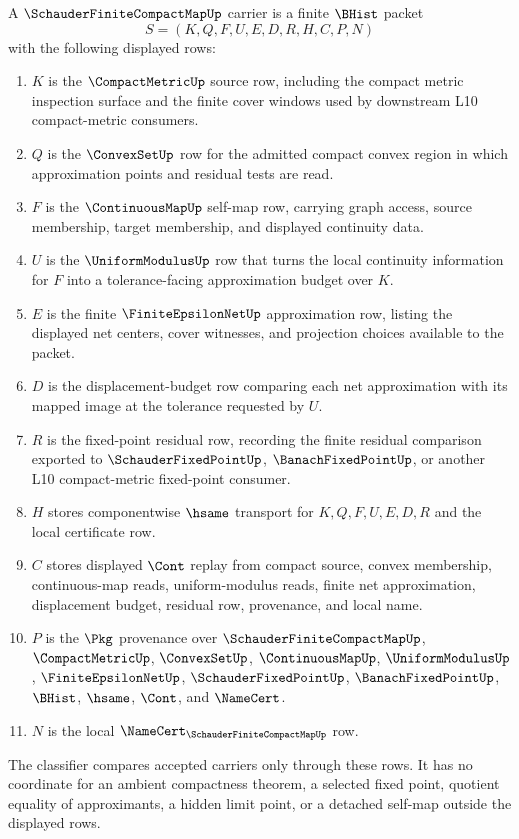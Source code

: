 \begin{definition}
\label{def:schauder-finite-compact-map-carrier}
A $\SchauderFiniteCompactMapUp$ carrier is a finite $\BHist$ packet
$$
S=(K,Q,F,U,E,D,R,H,C,P,N)
$$
with the following displayed rows:
\begin{enumerate}
\item $K$ is the $\CompactMetricUp$ source row, including the compact metric inspection surface and the finite cover windows used by downstream L10 compact-metric consumers.
\item $Q$ is the $\ConvexSetUp$ row for the admitted compact convex region in which approximation points and residual tests are read.
\item $F$ is the $\ContinuousMapUp$ self-map row, carrying graph access, source membership, target membership, and displayed continuity data.
\item $U$ is the $\UniformModulusUp$ row that turns the local continuity information for $F$ into a tolerance-facing approximation budget over $K$.
\item $E$ is the finite $\FiniteEpsilonNetUp$ approximation row, listing the displayed net centers, cover witnesses, and projection choices available to the packet.
\item $D$ is the displacement-budget row comparing each net approximation with its mapped image at the tolerance requested by $U$.
\item $R$ is the fixed-point residual row, recording the finite residual comparison exported to $\SchauderFixedPointUp$, $\BanachFixedPointUp$, or another L10 compact-metric fixed-point consumer.
\item $H$ stores componentwise $\hsame$ transport for $K,Q,F,U,E,D,R$ and the local certificate row.
\item $C$ stores displayed $\Cont$ replay from compact source, convex membership, continuous-map reads, uniform-modulus reads, finite net approximation, displacement budget, residual row, provenance, and local name.
\item $P$ is the $\Pkg$ provenance over $\SchauderFiniteCompactMapUp$, $\CompactMetricUp$, $\ConvexSetUp$, $\ContinuousMapUp$, $\UniformModulusUp$, $\FiniteEpsilonNetUp$, $\SchauderFixedPointUp$, $\BanachFixedPointUp$, $\BHist$, $\hsame$, $\Cont$, and $\NameCert$.
\item $N$ is the local $\NameCert_{\SchauderFiniteCompactMapUp}$ row.
\end{enumerate}
The classifier compares accepted carriers only through these rows. It has no coordinate for an ambient compactness theorem, a selected fixed point, quotient equality of approximants, a hidden limit point, or a detached self-map outside the displayed rows.
\end{definition}

